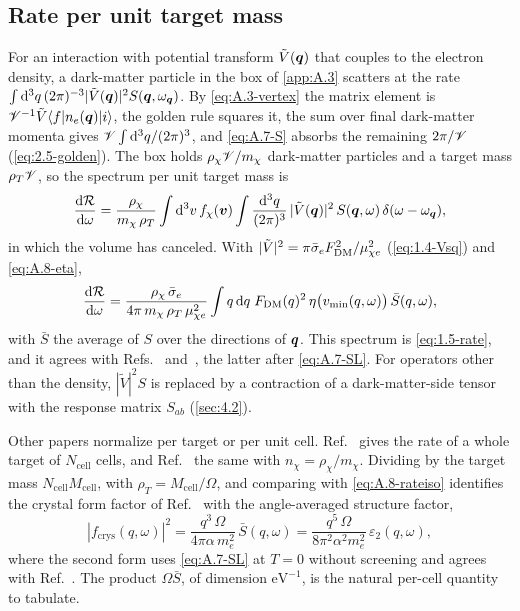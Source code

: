 \subsection{Rate per unit target mass}

For an interaction with potential transform $\tilde V(\bm{q})$ that couples to the electron density, a dark-matter particle in the box of \cref{app:A.3} scatters at the rate $\int\mathrm{d}^3q\,(2\pi)^{-3}|\tilde V(\bm{q})|^2S(\bm{q},\omega_{\bm{q}})$. By \cref{eq:A.3-vertex} the matrix element is $\mathscr{V}^{-1}\tilde V\langle f|n_e(\bm{q})|i\rangle$, the golden rule squares it, the sum over final dark-matter momenta gives $\mathscr{V}\int\mathrm{d}^3q/(2\pi)^3$, and \cref{eq:A.7-S} absorbs the remaining $2\pi/\mathscr{V}$ (\cref{eq:2.5-golden}). The box holds $\rho_\chi \mathscr{V}/m_\chi$ dark-matter particles and a target mass $\rho_T\mathscr{V}$, so the spectrum per unit target mass is
\begin{equation}
  \frac{\mathrm{d}\mathcal{R}}{\mathrm{d}\omega} = \frac{\rho_\chi}{m_\chi\,\rho_T}\int\mathrm{d}^3v\,f_\chi(\bm{v})\int\frac{\mathrm{d}^3q}{(2\pi)^3}\,|\tilde V(\bm{q})|^2\,S(\bm{q},\omega)\,\delta(\omega - \omega_{\bm{q}}),
  \label{eq:A.8-rate}
\end{equation}
in which the volume has canceled. With $|\tilde V|^2 = \pi\bar{\sigma}_{e}F_{\mathrm{DM}}^2/\mu_{\chi e}^2$ (\cref{eq:1.4-Vsq}) and \cref{eq:A.8-eta},
\begin{equation}
  \frac{\mathrm{d}\mathcal{R}}{\mathrm{d}\omega} = \frac{\rho_\chi\,\bar{\sigma}_{e}}{4\pi\,m_\chi\,\rho_T\,\mu_{\chi e}^2}\int q\,\mathrm{d} q\;F_{\mathrm{DM}}(q)^2\,\eta\bigl(v_{\mathrm{min}}(q,\omega)\bigr)\,\bar S(q,\omega),
  \label{eq:A.8-rateiso}
\end{equation}
with $\bar S$ the average of $S$ over the directions of $\bm{q}$. This spectrum is \cref{eq:1.5-rate}, and it agrees with Refs.~\cite[Eq.~(10)]{knapen2021dark} and~\cite[Eq.~(S.9)]{hochberg2021determining}, the latter after \cref{eq:A.7-SL}. For operators other than the density, $|\tilde V|^2S$ is replaced by a contraction of a dark-matter-side tensor with the response matrix $S_{ab}$ (\cref{sec:4.2}).

Other papers normalize per target or per unit cell. Ref.~\cite[Eq.~(3.13)]{essig2016direct} gives the rate of a whole target of $N_{\mathrm{cell}}$ cells, and Ref.~\cite[Eq.~(36)]{catena2021crystal} the same with $n_\chi = \rho_\chi/m_\chi$. Dividing by the target mass $N_{\mathrm{cell}}M_{\mathrm{cell}}$, with $\rho_T = M_{\mathrm{cell}}/\Omega$, and comparing with \cref{eq:A.8-rateiso} identifies the crystal form factor of Ref.~\cite{essig2016direct} with the angle-averaged structure factor,
\begin{equation}
  |f_{\mathrm{crys}}(q,\omega)|^2 = \frac{q^3\,\Omega}{4\pi\alpha\,m_e^2}\,\bar S(q,\omega)
  = \frac{q^5\,\Omega}{8\pi^2\alpha^2 m_e^2}\,\varepsilon_2(q,\omega),
  \label{eq:A.8-fcrys}
\end{equation}
where the second form uses \cref{eq:A.7-SL} at $T = 0$ without screening and agrees with Ref.~\cite[Eq.~(16)]{knapen2021dark}. The product $\Omega\bar S$, of dimension $\mathrm{eV}^{-1}$, is the natural per-cell quantity to tabulate.

